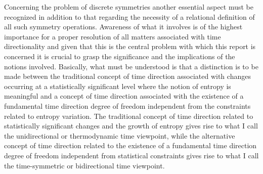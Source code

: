 \documentclass[notitlepage,12pt]{report}
\begin{document}
Concerning the problem of discrete symmetries another essential aspect must be recognized in addition to that regarding the necessity of a relational definition of all such symmetry operations. Awareness of what it involves is of the highest importance for a proper resolution of all matters associated with time directionality and given that this is the central problem with which this report is concerned it is crucial to grasp the significance and the implications of the notions involved. Basically, what must be understood is that a distinction is to be made between the traditional concept of time direction associated with changes occurring at a statistically significant level where the notion of entropy is meaningful and a concept of time direction associated with the existence of a fundamental time direction degree of freedom independent from the constraints related to entropy variation. The traditional concept of time direction related to statistically significant changes and the growth of entropy gives rise to what I call the unidirectional or thermodynamic time viewpoint, while the alternative concept of time direction related to the existence of a fundamental time direction degree of freedom independent from statistical constraints gives rise to what I call the time-symmetric or bidirectional time viewpoint.
\end{document}
